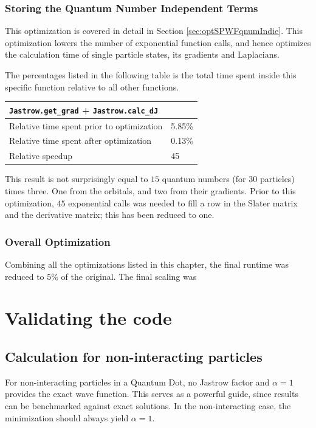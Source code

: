 \subsubsection{Storing the Quantum Number Independent Terms}

This optimization is covered in detail in Section \ref{sec:optSPWFqnumIndie}. This optimization lowers the number of exponential function calls, and hence optimizes the calculation time of single particle states, its gradients and Laplacians.

The percentages listed in the following table is the total time spent inside this specific function relative to all other functions. 

\begin{tabular}{ll}
 \verb+Jastrow.get_grad+ + \verb+Jastrow.calc_dJ+ & \\
 \hline\hline
 Relative time spent prior to optimization & 5.85\% \\
 Relative time spent after optimization    & 0.13\% \\
 \hline
 Relative speedup                          & 45
\end{tabular}

This result is not surprisingly equal to $15$ quantum numbers (for $30$ particles) times three. One from the orbitals, and two from their gradients. Prior to this optimization, $45$ exponential calls was needed to fill a row in the Slater matrix and the derivative matrix; this has been reduced to one.

\subsubsection{Overall Optimization}

Combining all the optimizations listed in this chapter, the final runtime was reduced to $5\%$ of the original. The final scaling was


\section{Validating the code}

\subsection{Calculation for non-interacting particles}

For non-interacting particles in a Quantum Dot, no Jastrow factor and $\alpha=1$ provides the exact wave function. This serves as a powerful guide, since results can be benchmarked against exact solutions. In the non-interacting case, the minimization should always yield $\alpha=1$.

